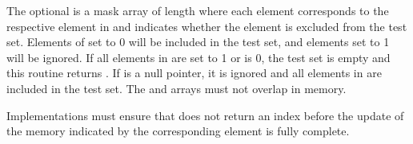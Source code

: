 \begin{apidefinition}
{    The optional  is a mask array of length  where each
    element corresponds to the respective element in  and indicates
    whether the element is excluded from the test set.  Elements of
     set to 0 will be included in the test set, and elements set to
    1 will be ignored.  If all elements in  are set to 1 or
     is 0, the test set is empty and this routine returns
    .  If  is a null pointer, it is ignored and
    all elements in  are included in the test set.  The 
    and  arrays must not overlap in memory.

    Implementations must ensure that  does not
    return an index before the update of the memory indicated by the
    corresponding  element is fully complete.
}




\end{apidefinition}
